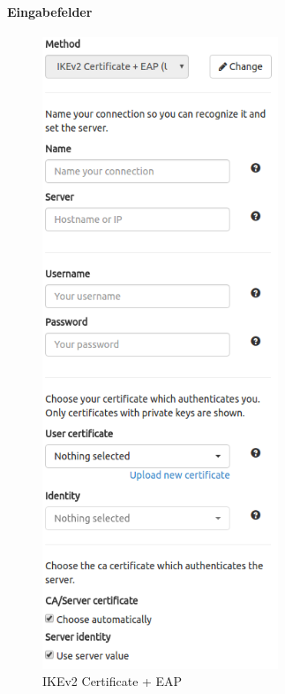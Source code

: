 \noindent\begin{minipage}[t]{0.5\textwidth}
\vspace{0pt}
\paragraph{Eingabefelder}\mbox{}\medskip
    \begin{figure}[H]
    	\centering
    	\includegraphics[width=200pt]{images/forms/ikev2_eap_cert.png}
    	\caption{IKEv2 Certificate + EAP}
    \end{figure}
\end{minipage}
\hfill
